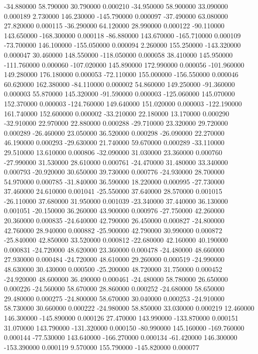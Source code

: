 -34.880000 58.790000 30.790000 0.000210 
-34.950000 58.900000 33.090000 0.000189 
2.730000 146.230000 -145.790000 0.000097 
-37.490000 63.080000 27.820000 0.000115 
-36.290000 64.120000 28.990000 0.000122 
-90.110000 143.650000 -168.300000 0.000118 
-86.880000 143.670000 -165.710000 0.000109 
-73.700000 146.100000 -155.050000 0.000094 
2.260000 155.250000 -143.320000 0.000047 
30.460000 148.550000 -118.050000 0.000058 
38.410000 145.950000 -111.760000 0.000060 
-107.020000 145.890000 172.990000 0.000056 
-101.960000 149.280000 176.180000 0.000053 
-72.110000 155.000000 -156.550000 0.000046 
60.620000 162.380000 -84.110000 0.000002 
54.860000 149.250000 -91.360000 0.000003 
55.870000 145.320000 -91.590000 0.000003 
-125.060000 145.070000 152.370000 0.000003 
-124.760000 149.640000 151.020000 0.000003 
-122.190000 161.740000 152.600000 0.000002 
-33.210000 22.180000 13.170000 0.000290 
-32.910000 22.970000 22.880000 0.000288 
-29.710000 23.320000 29.720000 0.000289 
-26.460000 23.050000 36.520000 0.000298 
-26.090000 22.270000 46.190000 0.000293 
-29.630000 21.740000 59.670000 0.000289 
-33.110000 29.510000 13.610000 0.000806 
-32.090000 31.030000 23.360000 0.000760 
-27.990000 31.530000 28.610000 0.000761 
-24.470000 31.480000 33.340000 0.000793 
-20.920000 30.650000 39.730000 0.000776 
-24.930000 28.700000 54.970000 0.000785 
-31.840000 36.590000 18.220000 0.000995 
-27.730000 37.460000 24.610000 0.001041 
-25.550000 37.640000 28.570000 0.001015 
-26.110000 37.680000 31.950000 0.001039 
-23.340000 37.440000 36.130000 0.001051 
-20.150000 36.260000 43.900000 0.000976 
-27.750000 42.260000 20.360000 0.000835 
-24.640000 42.790000 26.450000 0.000827 
-24.800000 42.760000 28.940000 0.000882 
-25.900000 42.790000 30.990000 0.000872 
-25.840000 42.850000 33.520000 0.000812 
-22.680000 42.160000 40.190000 0.000831 
-24.720000 48.620000 23.360000 0.000478 
-24.480000 48.660000 27.930000 0.000484 
-24.720000 48.610000 29.260000 0.000519 
-24.990000 48.630000 30.430000 0.000500 
-25.200000 48.720000 31.750000 0.000452 
-24.920000 48.600000 36.490000 0.000461 
-24.480000 58.780000 26.650000 0.000226 
-24.560000 58.670000 28.860000 0.000252 
-24.680000 58.650000 29.480000 0.000275 
-24.800000 58.670000 30.040000 0.000253 
-24.910000 58.730000 30.660000 0.000222 
-24.980000 58.850000 33.030000 0.000219 
12.460000 146.300000 -145.890000 0.000126 
27.470000 143.990000 -133.870000 0.000151 
31.070000 143.790000 -131.320000 0.000150 
-80.990000 145.160000 -169.760000 0.000144 
-77.530000 143.640000 -166.270000 0.000134 
-61.420000 146.300000 -153.390000 0.000119 
9.570000 155.790000 -145.820000 0.000077 
